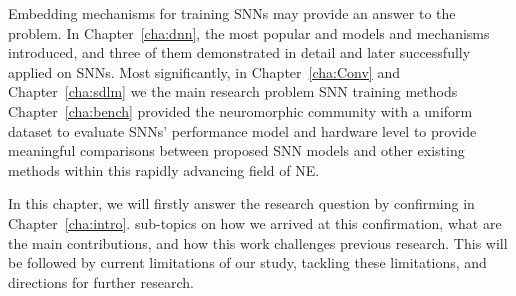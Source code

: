 Embedding \DIFdelbegin {}\DIFdelend \DIFaddbegin {}\DIFaddend mechanisms for training SNNs may provide an answer to the problem.
In Chapter~\ref{cha:dnn}, the most popular and \DIFdelbegin {}\DIFdelend \DIFaddbegin {}\DIFaddend models and mechanisms \DIFdelbegin {}\DIFdelend \DIFaddbegin {}\DIFaddend introduced, and three of them \DIFdelbegin {}\DIFdelend \DIFaddbegin {}\DIFaddend demonstrated in detail and later successfully applied on SNNs.
Most significantly, in Chapter~\ref{cha:Conv} and Chapter~\ref{cha:sdlm} we \DIFdelbegin {}\DIFdelend \DIFaddbegin {}\DIFaddend the main research problem \DIFdelbegin {}\DIFdelend \DIFaddbegin {}\DIFaddend SNN training methods \DIFdelbegin {}\DIFdelend \DIFaddbegin {}\DIFaddend Chapter~\ref{cha:bench} \DIFdelbegin {}\DIFdelend provided the neuromorphic community with a uniform dataset to evaluate SNNs' performance \DIFdelbegin {}\DIFdelend \DIFaddbegin {}\DIFaddend model and hardware level to provide meaningful comparisons between \DIFdelbegin {}\DIFdelend \DIFaddbegin {}\DIFaddend proposed SNN models and other existing methods within this rapidly advancing field of NE.%

In this chapter, we will firstly answer the research question by confirming \DIFdelbegin {}\DIFdelend \DIFaddbegin {}\DIFaddend in Chapter~\ref{cha:intro}.
\DIFdelbegin {}\DIFdelend \DIFaddbegin {}\DIFaddend sub-topics on how we arrived at this confirmation, what are the main contributions, and how this work challenges previous research.
This will be followed by \DIFdelbegin {}\DIFdelend \DIFaddbegin {}\DIFaddend current limitations of our study, \DIFdelbegin {}\DIFdelend \DIFaddbegin {}\DIFaddend tackling these limitations, and directions for further research.

